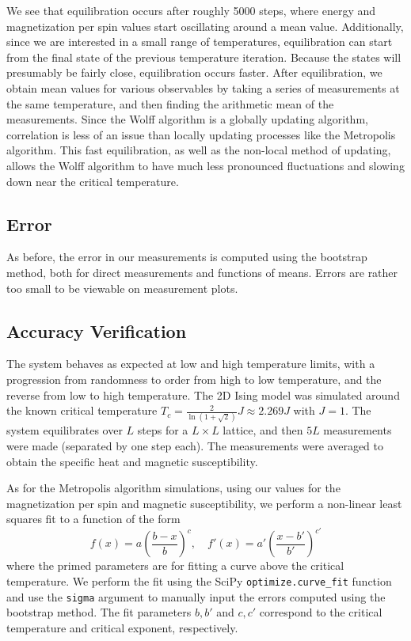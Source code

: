 \documentclass[twocolumn,aps]{revtex4-1} %
\begin{document}
We see that equilibration occurs after roughly 5000 steps, where energy and magnetization per spin values start oscillating around a mean value. Additionally, since we are interested in a small range of temperatures, equilibration can start from the final state of the previous temperature iteration. Because the states will presumably be fairly close, equilibration occurs faster. After equilibration, we obtain mean values for various observables by taking a series of measurements at the same temperature, and then finding the arithmetic mean of the measurements. Since the Wolff algorithm is a globally updating algorithm, correlation is less of an issue than locally updating processes like the Metropolis algorithm. This fast equilibration, as well as the non-local method of updating, allows the Wolff algorithm to have much less pronounced fluctuations and slowing down near the critical temperature. 

\subsection{Error}
As before, the error in our measurements is computed using the bootstrap method, both for direct measurements and functions of means. Errors are rather too small to be viewable on measurement plots.

\subsection{Accuracy Verification}
The system behaves as expected at low and high temperature limits, with a progression from randomness to order from high to low temperature, and the reverse from low to high temperature. The 2D Ising model was simulated around the known critical temperature $T_c = \frac{2}{\ln(1+\sqrt{2})}J \approx 2.269J$ with $J = 1$. The system equilibrates over $L$ steps for a $L \times L$ lattice, and then $5L$ measurements were made (separated by one step each). The measurements were averaged to obtain the specific heat and magnetic susceptibility. 

As for the Metropolis algorithm simulations, using our values for the magnetization per spin and magnetic susceptibility, we perform a non-linear least squares fit to a function of the form
\begin{equation}
	f(x) = a\left(\frac{b-x}{b}\right)^c, \quad f'(x) = a'\left(\frac{x-b'}{b'}\right)^{c'}
\end{equation}
where the primed parameters are for fitting a curve above the critical temperature. We perform the fit using the SciPy \texttt{optimize.curve\_fit} function and use the \texttt{sigma} argument to manually input the errors computed using the bootstrap method. The fit parameters $b,b'$ and $c,c'$ correspond to the critical temperature and critical exponent, respectively. 
\end{document}
